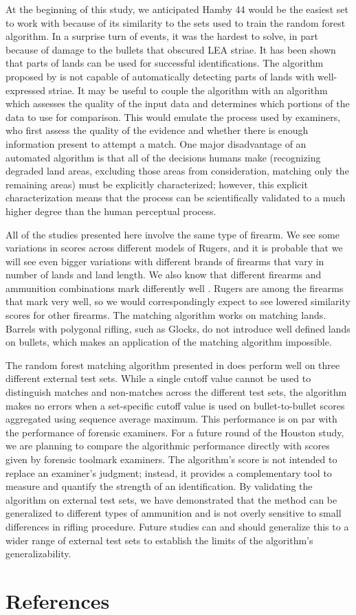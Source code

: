 \documentclass[doubleblind]{elsarticle}\usepackage[]{graphicx}\usepackage[]{color}
\begin{document}
At the beginning of this study, we anticipated Hamby 44 would be the easiest set to work with because of its similarity to the sets used to train the random forest algorithm. In a surprise turn of events, it was the hardest to solve, in part because of damage to the bullets that obscured LEA striae. It has been shown \citet{lpr2} that parts of lands can be used for successful identifications. The algorithm proposed by \citet{aoas2} is not capable of  automatically detecting parts of lands with well-expressed striae. It may be useful to couple the \citet{aoas2} algorithm with an algorithm which assesses the quality of the input data and determines which portions of the data to use for comparison. This would emulate the process used by examiners, who first assess the quality of the evidence and whether there is enough information present to attempt a match. One major disadvantage of an automated algorithm is that all of the decisions humans make (recognizing degraded land areas, excluding those areas from consideration, matching only the remaining areas) must be explicitly characterized; however, this explicit characterization means that the process can be scientifically validated to a much higher degree than the human perceptual process. 

All of the studies presented here involve the same type of firearm. We see some variations in scores across different models of Rugers, and it is probable that we will see even bigger variations with different brands of firearms that vary in number of lands and land length. We also know that different firearms and ammunition combinations mark differently well \citep{boltonkingPreventingMiscarriagesJustice2016, bonfantiInfluenc1999}. Rugers are among the firearms that mark very well, so we would correspondingly expect to see lowered similarity scores for other firearms. The matching algorithm works on matching lands. Barrels with polygonal rifling, such as Glocks, do not introduce well defined lands on bullets, which makes an application of the matching algorithm impossible.  


The random forest matching algorithm presented in \citet{aoas2} does perform well on three different external test sets. While a single cutoff value cannot be used to distinguish matches and non-matches across the different test sets, the algorithm makes no errors when a set-specific cutoff value is used on bullet-to-bullet scores aggregated using sequence average maximum. This performance is on par with the performance of forensic examiners. For a future round of the Houston study, we are planning to compare the algorithmic performance directly with scores given by forensic toolmark examiners. The algorithm's score is not intended to replace an examiner's judgment; instead, it provides a complementary tool to measure and quantify the strength of an identification. 
By validating the algorithm on external test sets, we have demonstrated that the method can be generalized to different types of ammunition and is not overly sensitive to small differences in rifling procedure. Future studies can and should generalize this to a wider range of external test sets to establish the limits of the algorithm's generalizability.



\section{References}


\end{document}
